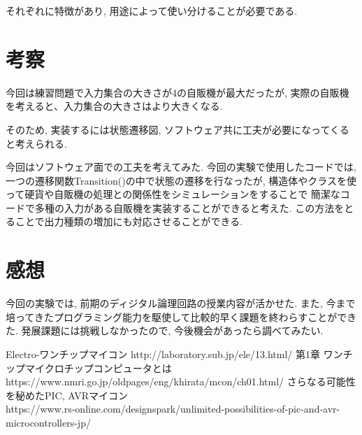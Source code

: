 \documentclass[titlepage]{jsarticle}
\begin{document}
    それぞれに特徴があり, 用途によって使い分けることが必要である.

\section{考察}
    今回は練習問題で入力集合の大きさが4の自販機が最大だったが,
    実際の自販機を考えると、入力集合の大きさはより大きくなる.

    そのため, 実装するには状態遷移図, ソフトウェア共に工夫が必要になってくると考えられる.

    今回はソフトウェア面での工夫を考えてみた.
    今回の実験で使用したコードでは, 一つの遷移関数Transition()の中で状態の遷移を行なったが, 
    構造体やクラスを使って硬貨や自販機の処理との関係性をシミュレーションをすることで
    簡潔なコードで多種の入力がある自販機を実装することができると考えた.
    この方法をとることで出力種類の増加にも対応させることができる.

\section{感想}
    今回の実験では, 前期のディジタル論理回路の授業内容が活かせた.
    また, 今まで培ってきたプログラミング能力を駆使して比較的早く課題を終わらすことができた.
    発展課題には挑戦しなかったので, 今後機会があったら調べてみたい.

\begin{thebibliography}{99}
     Electro-ワンチップマイコン http://laboratory.sub.jp/ele/13.html/
     第1章 ワンチップマイクロチップコンピュータとは \\
        https://www.nmri.go.jp/oldpages/eng/khirata/mcon/ch01.html/
     さらなる可能性を秘めたPIC, AVRマイコン \\
        https://www.rs-online.com/designspark/unlimited-possibilities-of-pic-and-avr-microcontrollers-jp/
\end{thebibliography}
\end{document}
